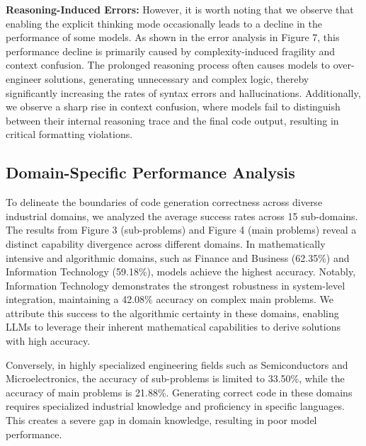 \documentclass{article}
\theoremstyle{plain}
\theoremstyle{definition}
\theoremstyle{remark}
\begin{document}
\textbf{Reasoning-Induced Errors:} However, it is worth noting that we observe that enabling the explicit thinking mode occasionally leads to a decline in the performance of some models. As shown in the error analysis in Figure 7, this performance decline is primarily caused by complexity-induced fragility and context confusion. The prolonged reasoning process often causes models to over-engineer solutions, generating unnecessary and complex logic, thereby significantly increasing the rates of syntax errors and hallucinations. Additionally, we observe a sharp rise in context confusion, where models fail to distinguish between their internal reasoning trace and the final code output, resulting in critical formatting violations.





\subsection{Domain-Specific Performance Analysis}
To delineate the boundaries of code generation correctness across diverse industrial domains, we analyzed the average success rates across 15 sub-domains. The results from Figure 3 (sub-problems) and Figure 4 (main problems) reveal a distinct capability divergence across different domains. In mathematically intensive and algorithmic domains, such as Finance and Business (62.35\%) and Information Technology (59.18\%), models achieve the highest accuracy. Notably, Information Technology demonstrates the strongest robustness in system-level integration, maintaining a 42.08\% accuracy on complex main problems. We attribute this success to the algorithmic certainty in these domains, enabling LLMs to leverage their inherent mathematical capabilities to derive solutions with high accuracy. 

Conversely, in highly specialized engineering fields such as Semiconductors and Microelectronics, the accuracy of sub-problems is limited to 33.50\%, while the accuracy of main problems is 21.88\%. Generating correct code in these domains requires specialized industrial knowledge and proficiency in specific languages. This creates a severe gap in domain knowledge, resulting in poor model performance. 
\end{document}
